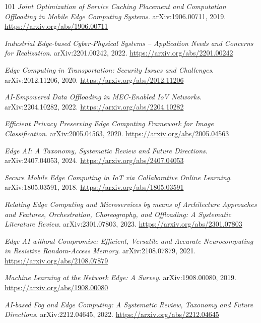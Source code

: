 \documentclass[11pt,a4paper]{article}
\begin{document}
\begin{thebibliography}{101}
\newblock \emph{Joint Optimization of Service Caching Placement and Computation Offloading in Mobile Edge Computing Systems}.
\newblock arXiv:1906.00711, 2019.
\newblock \url{https://arxiv.org/abs/1906.00711}

\newblock \emph{Industrial Edge-based Cyber-Physical Systems -- Application Needs and Concerns for Realization}.
\newblock arXiv:2201.00242, 2022.
\newblock \url{https://arxiv.org/abs/2201.00242}

\newblock \emph{Edge Computing in Transportation: Security Issues and Challenges}.
\newblock arXiv:2012.11206, 2020.
\newblock \url{https://arxiv.org/abs/2012.11206}

\newblock \emph{AI-Empowered Data Offloading in MEC-Enabled IoV Networks}.
\newblock arXiv:2204.10282, 2022.
\newblock \url{https://arxiv.org/abs/2204.10282}

\newblock \emph{Efficient Privacy Preserving Edge Computing Framework for Image Classification}.
\newblock arXiv:2005.04563, 2020.
\newblock \url{https://arxiv.org/abs/2005.04563}

\newblock \emph{Edge AI: A Taxonomy, Systematic Review and Future Directions}.
\newblock arXiv:2407.04053, 2024.
\newblock \url{https://arxiv.org/abs/2407.04053}

\newblock \emph{Secure Mobile Edge Computing in IoT via Collaborative Online Learning}.
\newblock arXiv:1805.03591, 2018.
\newblock \url{https://arxiv.org/abs/1805.03591}

\newblock \emph{Relating Edge Computing and Microservices by means of Architecture Approaches and Features, Orchestration, Choreography, and Offloading: A Systematic Literature Review}.
\newblock arXiv:2301.07803, 2023.
\newblock \url{https://arxiv.org/abs/2301.07803}

\newblock \emph{Edge AI without Compromise: Efficient, Versatile and Accurate Neurocomputing in Resistive Random-Access Memory}.
\newblock arXiv:2108.07879, 2021.
\newblock \url{https://arxiv.org/abs/2108.07879}

\newblock \emph{Machine Learning at the Network Edge: A Survey}.
\newblock arXiv:1908.00080, 2019.
\newblock \url{https://arxiv.org/abs/1908.00080}

\newblock \emph{AI-based Fog and Edge Computing: A Systematic Review, Taxonomy and Future Directions}.
\newblock arXiv:2212.04645, 2022.
\newblock \url{https://arxiv.org/abs/2212.04645}


\end{thebibliography}
\end{document}
